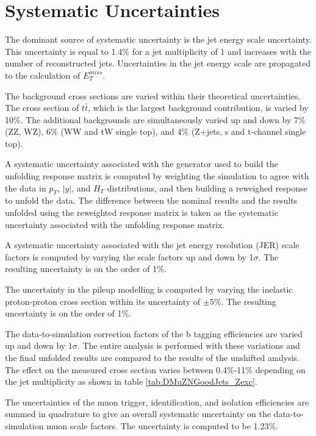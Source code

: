 \documentclass[oneside, letterpaper, oldfontcommands]{memoir}
\begin{document}
\section{Systematic Uncertainties}

\qquad The dominant source of systematic uncertainty is the jet energy scale uncertainty. This uncertainty is equal to 1.4\% for a jet multiplicity of 1 and increases with the number of reconstructed jets. Uncertainties in the jet energy scale are propagated to the calculation of $E_{T}^{miss}$.

\qquad The background cross sections are varied within their theoretical uncertainties. The cross section of $t\bar{t}$, which is the largest background contribution, is varied by 10\%. The additional backgrounds are simultaneously varied up and down by 7\% (ZZ, WZ), 6\% (WW and tW single top), and 4\% (Z+jets, s and t-channel single top). 

\qquad A systematic uncertainty associated with the generator used to build the unfolding response matrix is computed by weighting the simulation to agree with the data in $p_{T}$, $|y|$, and $H_{T}$ distributions, and then building a reweighed response to unfold the data. The difference between the nominal results and the results unfolded using the reweighted response matrix is taken as the systematic uncertainty associated with the unfolding response matrix.

\qquad A systematic uncertainty associated with the jet energy resolution (JER) scale factors is computed by varying the scale factors up and down by 1$\sigma$. The resulting uncertainty is on the order of 1\%.

\qquad The uncertainty in the pileup modelling is computed by varying the inelastic proton-proton cross section within its uncertainty of $\pm 5\%$. The resulting uncertainty is on the order of 1\%.

\qquad The data-to-simulation correction factors of the b tagging efficiencies are varied up and down by $1 \sigma$. The entire analysis is performed with these variations and the final unfolded results are compared to the results of the unshifted analysis. The effect on the measured cross section varies between 0.4\%-11\% depending on the jet multiplicity as shown in table \ref{tab:DMuZNGoodJets_Zexc}.

\qquad The uncertainties of the muon trigger, identification, and isolation efficiencies are summed in quadrature to give an overall systematic uncertainty on the data-to-simulation muon scale factors. The uncertainty is computed to be 1.23\%.
\end{document}
